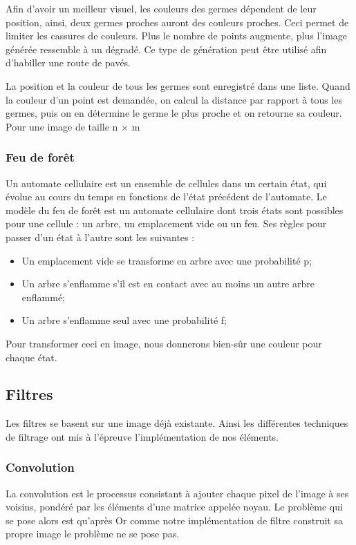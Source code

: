 \documentclass{article}
\begin{document}
Afin d'avoir un meilleur visuel, les couleurs des germes dépendent de leur position, ainsi, deux germes proches auront des couleurs proches. Ceci permet de limiter les cassures de couleurs. Plus le nombre de points augmente, plus l'image générée ressemble à un dégradé. Ce type de génération peut être utilisé afin d'habiller une route de pavés.

La position et la couleur de tous les germes sont enregistré dans une liste. Quand la couleur d'un point est demandée, on calcul la distance par rapport à tous les germes, puis on en détermine le germe le plus proche et on retourne sa couleur. Pour une image de taille n $\times$ m   
\subsubsection{Feu de forêt}
Un automate cellulaire est un ensemble de cellules dans un certain état, qui évolue au cours du temps en fonctions de l'état précédent de l'automate. Le modèle du feu de forêt est un automate cellulaire dont trois états sont possibles pour une cellule : un arbre, un emplacement vide ou un feu. Ses règles pour passer d'un état à l'autre sont les suivantes : 
\begin{itemize}
    \item Un emplacement vide se transforme en arbre avec une probabilité p;
    \item Un arbre s'enflamme s'il est en contact avec au moins un autre arbre enflammé;
    \item Un arbre s'enflamme seul avec une probabilité f;
\end{itemize}

Pour transformer ceci en image, nous donnerons bien-sûr une couleur pour chaque état.

\subsection{Filtres}

Les filtres se basent sur une image déjà existante. Ainsi les différentes techniques de filtrage ont mis à l'épreuve l'implémentation de nos éléments.

\subsubsection{Convolution}
La convolution est le processus consistant à ajouter chaque pixel de l'image à ses voisins, pondéré par les éléments d'une matrice appelée noyau.
Le problème qui se pose alors est qu'après
Or comme notre implémentation de filtre construit sa propre image le problème ne se pose pas.
\end{document}
